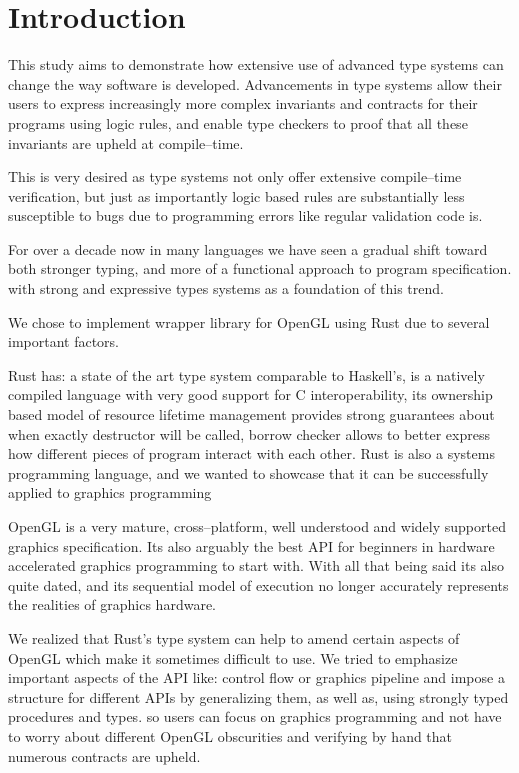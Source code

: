 \chapter*{Introduction}

This study aims to demonstrate how extensive use of advanced type systems can change the way software is developed.
Advancements in type systems allow their users to express increasingly more complex invariants and contracts for their programs using logic rules, 
and enable type checkers to proof that all these invariants are upheld at compile--time.

This is very desired as type systems not only offer extensive compile--time verification, but just as importantly logic based rules are substantially less susceptible to bugs
due to programming errors like regular validation code is.

For over a decade now in many languages we have seen a gradual shift toward both stronger typing, and more of a functional approach to program specification.
with strong and expressive types systems as a foundation of this trend.

We chose to implement wrapper library for OpenGL using Rust due to several important factors.

Rust has: a state of the art type system comparable to Haskell's, 
is a natively compiled language with very good support for C interoperability,
its ownership based model of resource lifetime management provides strong guarantees about when exactly destructor will be called,
borrow checker allows to better express how different pieces of program interact with each other.
Rust is also a systems programming language, and we wanted to showcase that it can be successfully applied to graphics programming \cite{rustpage}

OpenGL is a very mature, cross--platform, well understood and widely supported graphics specification.
Its also arguably the best API for beginners in hardware accelerated graphics programming to start with.
With all that being said its also quite dated, and its sequential model of execution no longer accurately represents the realities of graphics hardware.

We realized that Rust's type system can help to amend certain aspects of OpenGL which make it sometimes difficult to use.
We tried to emphasize important aspects of the API like: control flow or graphics pipeline and 
impose a structure for different APIs by generalizing them, as well as, using strongly typed procedures and types.
so users can focus on graphics programming and not have to worry about different OpenGL obscurities and verifying by hand that 
numerous contracts are upheld.
